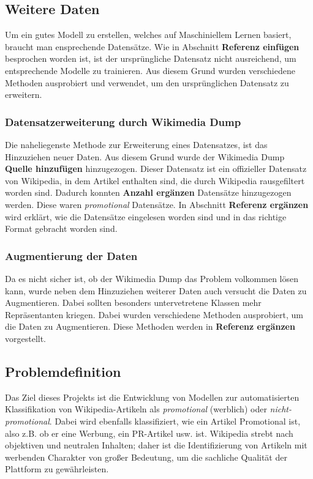 \subsection{Weitere Daten}
Um ein gutes Modell zu erstellen, welches auf Maschiniellem Lernen basiert, braucht man ensprechende Datensätze. Wie in Abschnitt \textbf{Referenz einfügen} besprochen worden ist, ist der ursprüngliche Datensatz nicht ausreichend, um entsprechende Modelle zu trainieren. Aus diesem Grund wurden verschiedene Methoden ausprobiert und verwendet, um den ursprünglichen Datensatz zu erweitern.




\subsubsection{Datensatzerweiterung durch Wikimedia Dump}
Die naheliegenste Methode zur Erweiterung eines Datensatzes, ist das Hinzuziehen neuer Daten. Aus diesem Grund wurde der Wikimedia Dump \textbf{Quelle hinzufügen} hinzugezogen. Dieser Datensatz ist ein offizieller Datensatz von Wikipedia, in dem Artikel enthalten sind, die durch Wikipedia rausgefiltert worden sind. Dadurch konnten \textbf{Anzahl ergänzen} Datensätze hinzugezogen werden. Diese waren \textit{promotional} Datensätze. In Abschnitt \textbf{Referenz ergänzen} wird erklärt, wie die Datensätze eingelesen worden sind und in das richtige Format gebracht worden sind.

\subsubsection{Augmentierung der Daten}
Da es nicht sicher ist, ob der Wikimedia Dump das Problem volkommen lösen kann, wurde neben dem Hinzuziehen weiterer Daten auch versucht die Daten zu Augmentieren. Dabei sollten besonders untervetretene Klassen mehr Repräsentanten kriegen. Dabei wurden verschiedene Methoden ausprobiert, um die Daten zu Augmentieren. Diese Methoden werden in \textbf{Referenz ergänzen} vorgestellt.

\subsection{Problemdefinition}
Das Ziel dieses Projekts ist die Entwicklung von Modellen zur automatisierten Klassifikation von Wikipedia-Artikeln als \emph{promotional} (werblich) oder \emph{nicht-promotional}. Dabei wird ebenfalls klassifiziert, wie ein Artikel Promotional ist, also z.B. ob er eine Werbung, ein PR-Artikel usw. ist. Wikipedia strebt nach objektiven und neutralen Inhalten; daher ist die Identifizierung von Artikeln mit werbenden Charakter von großer Bedeutung, um die sachliche Qualität der Plattform zu gewährleisten.

